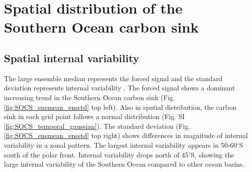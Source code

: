 \chapter{Spatial distribution of the Southern Ocean carbon sink}\label{ch:spatial} %
\section{Spatial internal variability}

The large ensemble median represents the forced signal and the standard deviation represents internal variability \citep{Deser2012}. The forced signal shows a dominant increasing trend in the Southern Ocean carbon sink (Fig. \ref{fig:SOCS_ensmean_ensstd} top left). Also in spatial distribution, the carbon sink in each grid point follows a normal distribution (Fig. SI \ref{fig:SOCS_temporal_gaussian}). The standard deviation (Fig. \ref{fig:SOCS_ensmean_ensstd} top right) shows differences in magnitude of internal variability in a zonal pattern. The largest internal variability appears in 50-60$^\circ$S south of the polar front. Internal variability drops north of 45$^\circ$S, showing the large internal variability of the Southern Ocean compared to other ocean basins.


